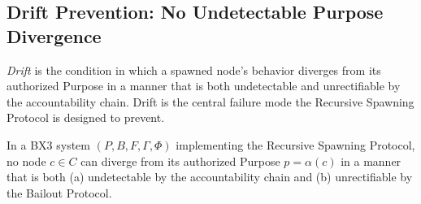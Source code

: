 \subsection{Drift Prevention: No Undetectable Purpose Divergence}
\label{sec:rs-drift-prevention}

\textit{Drift} is the condition in which a spawned node's behavior diverges from its authorized Purpose in a manner that is both undetectable and unrectifiable by the accountability chain. Drift is the central failure mode the Recursive Spawning Protocol is designed to prevent.

\begin{thrm}
\label{thrm:drift-prevention}
In a BX3 system $(P, B, F, \Gamma, \Phi)$ implementing the Recursive Spawning Protocol, no node $c \in C$ can diverge from its authorized Purpose $p = \alpha(c)$ in a manner that is both (a) undetectable by the accountability chain and (b) unrectifiable by the Bailout Protocol.
\end{thrm}

